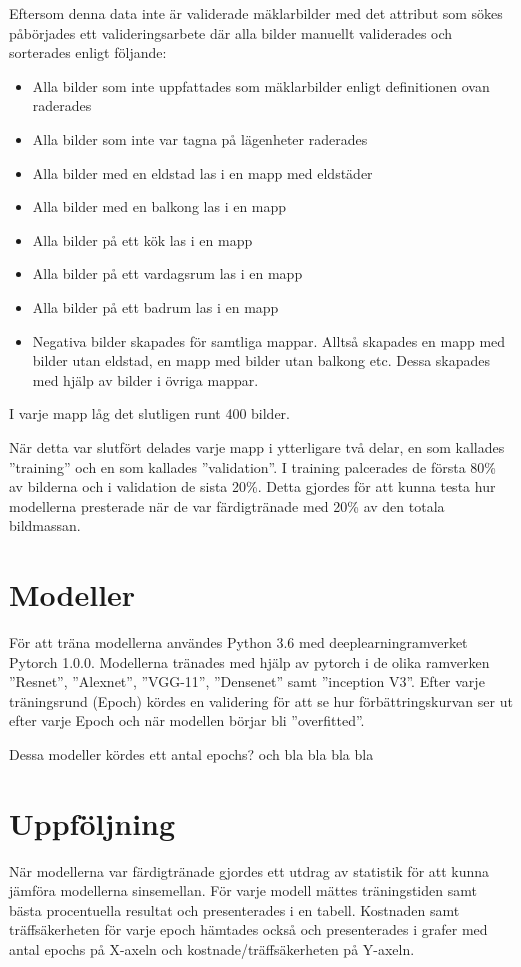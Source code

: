 \documentclass[]{kththesis}
\begin{document}
Eftersom denna data inte är validerade mäklarbilder med det attribut som sökes påbörjades ett valideringsarbete där alla bilder manuellt validerades och sorterades enligt följande:
\begin{itemize}
  \item Alla bilder som inte uppfattades som mäklarbilder enligt definitionen ovan raderades
  \item Alla bilder som inte var tagna på lägenheter raderades
  \item Alla bilder med en eldstad las i en mapp med eldstäder
  \item Alla bilder med en balkong las i en mapp
  \item Alla bilder på ett kök las i en mapp
  \item Alla bilder på ett vardagsrum las i en mapp
  \item Alla bilder på ett badrum las i en mapp
  \item Negativa bilder skapades för samtliga mappar. Alltså skapades en mapp med bilder utan eldstad, en mapp med bilder utan balkong etc. Dessa skapades med hjälp av bilder i övriga mappar. 
\end{itemize} 

I varje mapp låg det slutligen runt 400 bilder. 

När detta var slutfört delades varje mapp i ytterligare två delar, en som kallades ”training” och en som kallades ”validation”.
I training palcerades de första 80\% av bilderna och i validation de sista 20\%.
Detta gjordes för att kunna testa hur modellerna presterade när de var färdigtränade med 20\% av den totala bildmassan.


\section{Modeller}
För att träna modellerna användes Python 3.6 med deeplearningramverket Pytorch 1.0.0. 
Modellerna tränades med  hjälp av pytorch i de olika ramverken ”Resnet”, ”Alexnet”, ”VGG-11”, ”Densenet” samt ”inception V3”.
Efter varje träningsrund (Epoch) kördes en validering för att se hur förbättringskurvan ser ut efter varje Epoch och när modellen börjar bli ”overfitted”.

Dessa modeller kördes ett antal epochs? och bla bla bla bla

\section{Uppföljning}
När modellerna var färdigtränade gjordes ett utdrag av statistik för att kunna jämföra modellerna sinsemellan.
För varje modell mättes träningstiden samt bästa procentuella resultat och presenterades i en tabell.
Kostnaden samt träffsäkerheten för varje epoch hämtades också och presenterades i grafer med antal epochs på X-axeln och kostnade/träffsäkerheten på Y-axeln.
\end{document}
